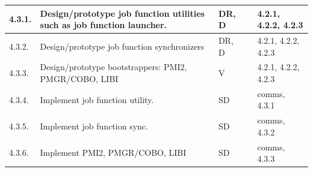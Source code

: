 \begin{longtable}{|p{1cm}|p{10.2cm}|p{1cm}|p{1cm}|p{1.8cm}|}
  \hline
  4.3.1.& Design/prototype job function utilities such as job function
          launcher.
        & DR, D
        & 
        & 4.2.1, 4.2.2, 4.2.3 \\
  \hline
  4.3.2.& Design/prototype job function synchronizers
        & DR, D
        & 
        & 4.2.1, 4.2.2, 4.2.3 \\
  \hline
  4.3.3.& Design/prototype bootstrappers: PMI2, PMGR/COBO, LIBI
        & V
        & 
        & 4.2.1, 4.2.2, 4.2.3 \\
  \hline
  4.3.4.& Implement job function utility.
        & SD
        & 
        & comms, 4.3.1 \\
  \hline
  4.3.5.& Implement job function sync.
        & SD
        & 
        & comms, 4.3.2 \\
  \hline
  4.3.6.& Implement PMI2, PMGR/COBO, LIBI
        & SD
        & 
        & comms, 4.3.3 \\
  \hline
\end{longtable}
